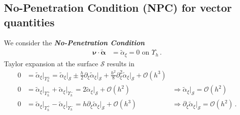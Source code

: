 \documentclass[a4paper,10pt]{scrartcl}
\newcommand{\surf}{\mathcal{S}}
\newcommand{\landau}{\mathcal{O}}
\newcommand{\nub}{\bm{\nu}}
\newcommand{\alphab}{\bm{\alpha}}
\newcommand{\talphab}{\tilde{\alphab}}
\newcommand{\talpha}{\tilde{\alpha}}
\newcommand{\boundary}[1]{\Upsilon_{h}^{#1}}
\newcommand{\AtBoundary}[1]{\big|_{\boundary{#1}}}
\newcommand{\AtSurface}{\big|_{\surf}}
\newcommand{\formPeriod}{\,\text{.}}
\newcommand{\newterm}[1]{\textbf{\textit{#1}}}
\begin{document}
  \subsection{No-Penetration Condition (NPC) for vector quantities}
    We consider the \newterm{No-Penetration Condition}
    \begin{align}
      \nub \cdot \talphab &= \talpha_{\xi} = 0 \text{ on }\boundary{} \formPeriod
      \tag{NPC}
    \end{align}
    Taylor expansion at the surface \( \surf \) results in
    \begin{align}
      0 &= \talpha_{\xi}\AtBoundary{\pm} 
          = \talpha_{\xi}\AtSurface \pm \frac{h}{2}\partial_{\xi}\talpha_{\xi}\AtSurface + \frac{h^{2}}{8}\partial_{\xi}^{2}\talpha_{\xi}\AtSurface + \landau(h^{3})\\
      0 &= \talpha_{\xi}\AtBoundary{+} + \talpha_{\xi}\AtBoundary{-}
         = 2 \talpha_{\xi}\AtSurface + \landau(h^{2}) 
       &\Rightarrow \boxed{\talpha_{\xi}\AtSurface = \landau(h^{2})}\\
      0 &= \talpha_{\xi}\AtBoundary{+} - \talpha_{\xi}\AtBoundary{-}
         = h \partial_{\xi}\talpha_{\xi}\AtSurface + \landau(h^{3})
        &\Rightarrow \boxed{\partial_{\xi}\talpha_{\xi}\AtSurface = \landau(h^{2})} \formPeriod
    \end{align}
\end{document}
